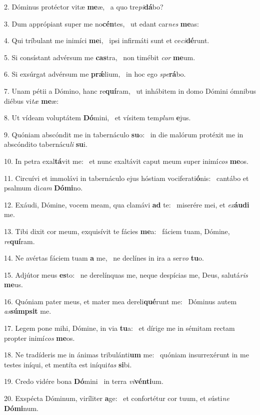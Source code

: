 2. Dóminus protéctor vitæ \textbf{me}æ, \ast\  a quo tre\textit{pi}\textbf{dá}bo?\

3. Dum apprópiant super me no\textbf{cén}tes, \ast\  ut edant car\textit{nes} \textbf{me}as:\

4. Qui tríbulant me inimíci \textbf{me}i, \ast\  ipsi infirmáti sunt et ce\textit{ci}\textbf{dé}runt.\

5. Si consístant advérsum me \textbf{cas}tra, \ast\  non timébit \textit{cor} \textbf{me}um.\

6. Si exsúrgat advérsum me \textbf{prǽ}lium, \ast\  in hoc ego \textit{spe}\textbf{rá}bo.\

7. Unam pétii a Dómino, hanc re\textbf{quí}ram, \ast\  ut inhábitem in domo Dómini ómnibus diébus vi\textit{tæ} \textbf{me}æ:\

8. Ut vídeam voluptátem \textbf{Dó}mini, \ast\  et vísitem tem\textit{plum} \textbf{e}jus.\

9. Quóniam abscóndit me in tabernáculo \textbf{su}o: \ast\  in die malórum protéxit me in abscóndito tabernácu\textit{li} \textbf{su}i.\

10. In petra exal\textbf{tá}vit me: \ast\  et nunc exaltávit caput meum super inimí\textit{cos} \textbf{me}os.\

11. Circuívi et immolávi in tabernáculo ejus hóstiam vociferati\textbf{ó}nis: \ast\  cantábo et psalmum di\textit{cam} \textbf{Dó}\textbf{mi}no.\

12. Exáudi, Dómine, vocem meam, qua clamávi \textbf{ad} te: \ast\  miserére mei, et \textit{ex}\textbf{áu}\textbf{di} me.\

13. Tibi dixit cor meum, exquisívit te fácies \textbf{me}a: \ast\  fáciem tuam, Dómine, \textit{re}\textbf{quí}ram.\

14. Ne avértas fáciem tuam \textbf{a} me, \ast\  ne declínes in ira a ser\textit{vo} \textbf{tu}o.\

15. Adjútor meus \textbf{es}to: \ast\  ne derelínquas me, neque despícias me, Deus, salutá\textit{ris} \textbf{me}us.\

16. Quóniam pater meus, et mater mea dereli\textbf{qué}runt me: \ast\  Dóminus autem \textit{as}\textbf{súmp}\textbf{sit} me.\

17. Legem pone mihi, Dómine, in via \textbf{tu}a: \ast\  et dírige me in sémitam rectam propter inimí\textit{cos} \textbf{me}os.\

18. Ne tradíderis me in ánimas tribulánti\textbf{um} me: \ast\  quóniam insurrexérunt in me testes iníqui, et mentíta est iníqui\textit{tas} \textbf{si}bi.\

19. Credo vidére bona \textbf{Dó}mini \ast\  in terra \textit{vi}\textbf{vén}\textbf{ti}um.\

20. Exspécta Dóminum, viríliter \textbf{a}ge: \ast\  et confortétur cor tuum, et sústi\textit{ne} \textbf{Dó}\textbf{mi}num.\

